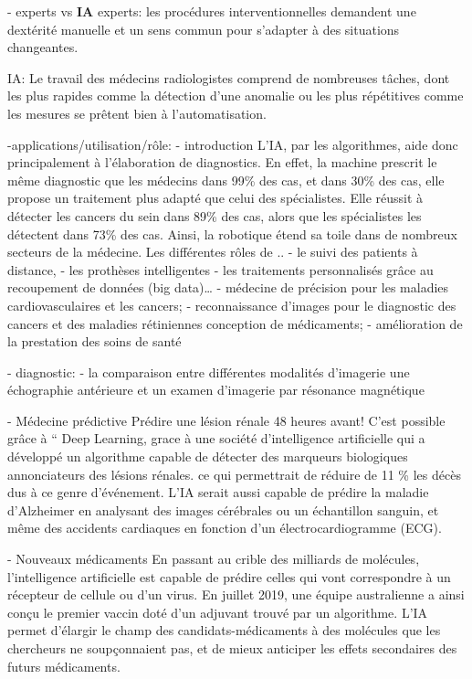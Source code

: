- experts  vs \textbf{IA} 
    experts:
        les procédures interventionnelles demandent une dextérité
        manuelle et un sens commun pour s'adapter à des situations changeantes.

    IA: Le travail des médecins radiologistes comprend de nombreuses tâches,
        dont les plus rapides comme la détection d'une anomalie ou les plus
        répétitives comme les mesures se prêtent bien à l'automatisation.


-applications/utilisation/rôle:
- introduction
    L'IA, par les algorithmes, aide donc principalement à l'élaboration de
    diagnostics.
    En effet, la machine prescrit le même diagnostic que les
    médecins dans 99\% des cas, et dans 30\% des cas, elle propose un
    traitement plus adapté que celui des spécialistes. Elle réussit à
    détecter les cancers du sein dans 89\% des cas, alors que les
    spécialistes les détectent dans 73\% des cas. Ainsi, la robotique
    étend sa toile dans de nombreux secteurs de la médecine.
Les différentes rôles de ..
    - le suivi des patients à distance,
    - les prothèses intelligentes
    - les traitements personnalisés grâce au recoupement de données (big data)… 
    - médecine de précision pour les maladies cardiovasculaires et les cancers;
    - reconnaissance d'images pour le diagnostic des cancers et des maladies rétiniennes conception de médicaments;
    - amélioration de la prestation des soins de santé

- diagnostic:
    - la comparaison entre différentes modalités d'imagerie une
      échographie antérieure et un examen d'imagerie par résonance
      magnétique 

- Médecine prédictive
    Prédire une lésion rénale 48 heures avant! C'est possible grâce à ``
    Deep Learning, grace à une société d'intelligence artificielle qui
    a développé un algorithme capable de détecter des marqueurs
    biologiques annonciateurs des lésions rénales. ce qui permettrait de
    réduire de 11 \% les décès dus à ce genre d'événement. L'IA serait
    aussi capable de prédire la maladie d'Alzheimer en analysant des
    images cérébrales ou un échantillon sanguin, et même des accidents
    cardiaques en fonction d'un électrocardiogramme (ECG).

- Nouveaux médicaments
    En passant au crible des milliards de molécules, l'intelligence
    artificielle est capable de prédire celles qui vont correspondre à un
    récepteur de cellule ou d'un virus. En juillet 2019, une équipe
    australienne a ainsi conçu le premier vaccin doté d'un adjuvant trouvé
    par un algorithme. L'IA permet d'élargir le champ des
    candidats-médicaments à des molécules que les chercheurs ne
    soupçonnaient pas, et de mieux anticiper les effets secondaires des
    futurs médicaments.


